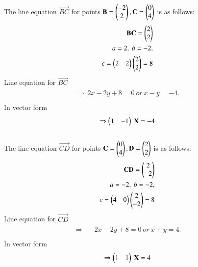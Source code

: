 \documentclass[journal,12pt,twocolumn]{IEEEtran}
\begin{document}
\\
The line equation $\vec{BC}$ for points $\mathbf{B} = \begin{pmatrix}-2\\2\end{pmatrix},\mathbf{C}=\begin{pmatrix}0\\4\end{pmatrix}$ is as follows:
\\
\begin{align}
\begin{split}
\mathbf{BC} = \begin{pmatrix}2\\2\end{pmatrix}\\
a=2,\ b=-2,\\
c=\begin{pmatrix}2 & 2\end{pmatrix} \begin{pmatrix}2\\2\end{pmatrix}=8
\end{split}
\end{align}
Line equation for $\vec{BC}$
\begin{align}
\begin{split}
\Rightarrow\ 2x-2y+8=0 \ or \ x-y=-4. \\
\end{split}
\end{align}
In vector form
\begin{align}
\begin{split}
\Rightarrow \begin{pmatrix}1&-1\end{pmatrix}\ \mathbf{X}=-4
\end{split}
\end{align}
\\
The line equation $\vec{CD}$ for points $\mathbf{C}=\begin{pmatrix}0\\4\end{pmatrix},\mathbf{D} = \begin{pmatrix}2\\2\end{pmatrix}$ is as follows:
\\
\begin{align}
\begin{split}
\mathbf{CD} = \begin{pmatrix}2\\-2\end{pmatrix}\\
a=-2,\ b=-2,\\
c=\begin{pmatrix}4 & 0\end{pmatrix} \begin{pmatrix}2\\-2\end{pmatrix}=8
\end{split}
\end{align}
Line equation for $\vec{CD}$
\begin{align}
\begin{split}
\Rightarrow\ -2x-2y+8=0 \ or \ x+y=4. \\
\end{split}
\end{align}
In vector form
\begin{align}
\begin{split}
\Rightarrow \begin{pmatrix}1&1\end{pmatrix}\ \mathbf{X}=4
\end{split}
\end{align}
\\
\end{document}
